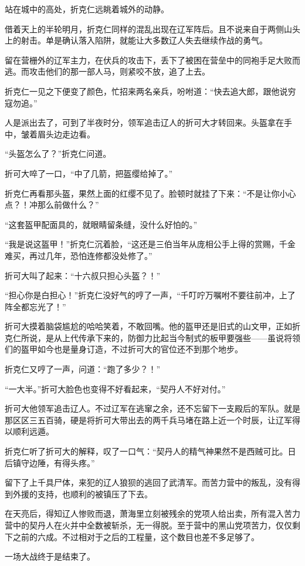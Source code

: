 站在城中的高处，折克仁远眺着城外的动静。

借着天上的半轮明月，折克仁同样的混乱出现在辽军阵后。且不说来自于两侧山头上的射击。单是确认落入陷阱，就能让大多数辽人失去继续作战的勇气。

留在营栅外的辽军主力，在伏兵的攻击下，丢下了被困在营垒中的同袍手足大败而逃。而攻击他们的那一部人马，则紧咬不放，追了上去。

折克仁一见之下便变了颜色，忙招来两名亲兵，吩咐道：“快去追大郎，跟他说穷寇勿追。”

人是派出去了，可到了半夜时分，领军追击辽人的折可大才转回来。头盔拿在手中，皱着眉头边走边看。

“头盔怎么了？”折克仁问道。

折可大啐了一口，“中了几箭，把盔缨给掉了。”

折克仁再看那头盔，果然上面的红缨不见了。脸顿时就挂了下来：“不是让你小心点？！冲那么前做什么？”

“这套盔甲配面具的，就眼睛留条缝，没什么好怕的。”

“我是说这盔甲！”折克仁沉着脸，“这还是三伯当年从庞相公手上得的赏赐，千金难买，再过几年，恐怕连修都没处修了。”

折可大叫了起来：“十六叔只担心头盔？！”

“担心你是白担心！”折克仁没好气的哼了一声，“千叮咛万嘱咐不要往前冲，上了阵全都忘光了！”

折可大摸着脑袋尴尬的哈哈笑着，不敢回嘴。他的盔甲还是旧式的山文甲，正如折克仁所说，是从上代传承下来的，防御力比起当今制式的板甲要强些——虽说将领们的盔甲如今也是量身订造，不过折可大的官位还不到那个地步。

折克仁又哼了一声，问道：“跑了多少？！”

“一大半。”折可大脸色也变得不好看起来，“契丹人不好对付。”

折可大他领军追击辽人。不过辽军在逃窜之余，还不忘留下一支殿后的军队。就是那区区三五百骑，硬是将折可大带出去的两千兵马堵在路上近一个时辰，让辽军得以顺利远遁。

折克仁听了折可大的解释，叹了一口气：“契丹人的精气神果然不是西贼可比。日后镇守边陲，有得头疼。”

留下了上千具尸体，来犯的辽人狼狈的逃回了武清军。而苦力营中的叛乱，没有得到外援的支持，也顺利的被镇压了下去。

在天亮后，得知辽人惨败而退，萧海里立刻被残余的党项人给出卖，所有混入苦力营中的契丹人在火并中全数被斩杀，无一得脱。至于营中的黑山党项苦力，仅仅剩下之前的六成。不过相对于之后的工程量，这个数目也差不多足够了。

一场大战终于是结束了。

